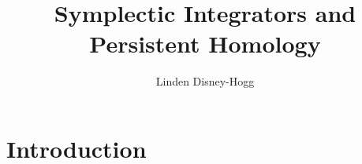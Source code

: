 \documentclass{article}
\title{Symplectic Integrators and Persistent Homology}
\author{Linden Disney-Hogg}
\date{}
\begin{document}
\maketitle
\tableofcontents

\section{Introduction}



\end{document}
